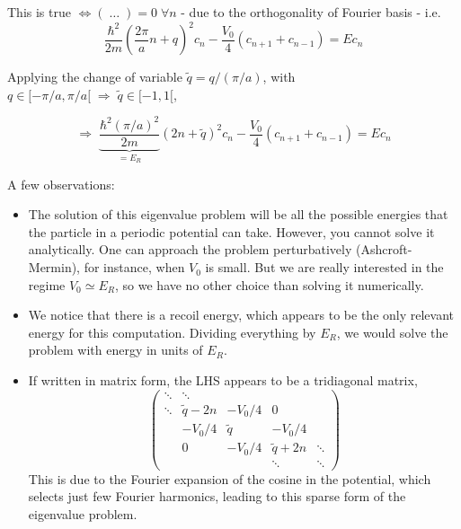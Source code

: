 \noindent This is true $ \Leftrightarrow \left( \; \dots \; \right) = 0 \; \forall n$ - due to the orthogonality of Fourier basis - i.e.
\begin{equation*}
\frac{\hbar^2}{2m}
\left(\frac{2\pi}{a}n+q\right)^2 c_n
- \frac{V_0}{4} \left( c_{n+1} + c_{n-1} \right)
= E c_n
\end{equation*}

\noindent Applying the change of variable $\tilde{q} = q/(\pi/a)$, with $q\in[-\pi/a, \pi/a[ \;\Rightarrow\; \tilde{q} \in [-1,1[$,

\begin{equation}
\label{eq:final-bands}
\Rightarrow \; 
\underbrace{\frac{\hbar^2 (\pi/a)^2}{2m}}
_{= E_R}
\left(2n+\tilde{q}\right)^2 c_n
- \frac{V_0}{4} \left( c_{n+1} + c_{n-1} \right)
= E c_n
\end{equation}

\noindent A few observations:
\begin{itemize}
\item The solution of this eigenvalue problem will be all the possible energies that the particle in a periodic potential can take. However, you cannot solve it analytically. One can approach the problem perturbatively (Ashcroft-Mermin), for instance, when $V_0$ is small. But we are really interested in the regime $V_0 \simeq E_R$, so we have no other choice than solving it numerically.
\item We notice that there is a recoil energy, which appears to be the only relevant energy for this computation. Dividing everything by $E_R$, we would solve the problem with energy in units of $E_R$.
\item If written in matrix form, the LHS appears to be a tridiagonal matrix,
\begin{equation*}
    \begin{pmatrix}
    \ddots & \ddots\\
    \ddots & \tilde{q}-2n & -V_0/4    & 0\\
           & -V_0/4       & \tilde{q} & -V_0/4\\
           & 0            & -V_0/4    & \tilde{q}+2n & \ddots\\
           &              &           & \ddots       & \ddots
    \end{pmatrix}
\end{equation*}
This is due to the Fourier expansion of the cosine in the potential, which selects just few Fourier harmonics, leading to this sparse form of the eigenvalue problem.

\end{itemize}

